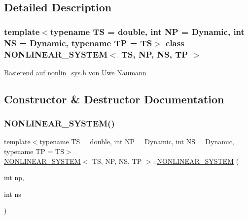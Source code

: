 \subsection{Detailed Description}
\subsubsection*{template$<$typename TS = double, int NP = Dynamic, int NS = Dynamic, typename TP = TS$>$\newline
class N\+O\+N\+L\+I\+N\+E\+A\+R\+\_\+\+S\+Y\+S\+T\+E\+M$<$ T\+S, N\+P, N\+S, T\+P $>$}

Basierend auf \mbox{\hyperlink{nonlin__sys_8h}{nonlin\+\_\+sys.\+h}} von Uwe Naumann 

\subsection{Constructor \& Destructor Documentation}
\mbox{\label{class_n_o_n_l_i_n_e_a_r___s_y_s_t_e_m_aa6073542adb090bf99729df5b03ca707}} 
\subsubsection{\texorpdfstring{N\+O\+N\+L\+I\+N\+E\+A\+R\+\_\+\+S\+Y\+S\+T\+E\+M()}{NONLINEAR\_SYSTEM()}}
{\footnotesize\ttfamily template$<$typename TS = double, int NP = Dynamic, int NS = Dynamic, typename TP = TS$>$ \\
\mbox{\hyperlink{class_n_o_n_l_i_n_e_a_r___s_y_s_t_e_m}{N\+O\+N\+L\+I\+N\+E\+A\+R\+\_\+\+S\+Y\+S\+T\+EM}}$<$ TS, NP, NS, TP $>$\+::\mbox{\hyperlink{class_n_o_n_l_i_n_e_a_r___s_y_s_t_e_m}{N\+O\+N\+L\+I\+N\+E\+A\+R\+\_\+\+S\+Y\+S\+T\+EM}} (\begin{DoxyParamCaption}\item[{int}]{np,  }\item[{int}]{ns }\end{DoxyParamCaption})\hspace{0.3cm}{\ttfamily [inline]}}



